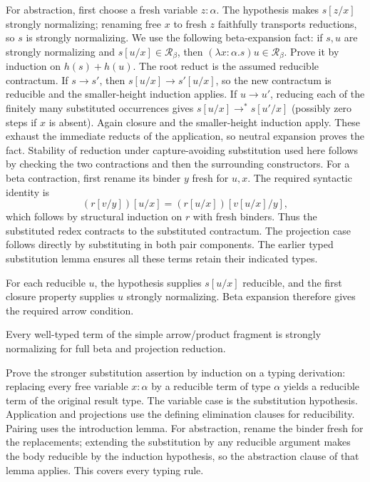 For abstraction, first choose a fresh variable $z:\alpha$. The
hypothesis makes $s[z/x]$ strongly normalizing; renaming free $x$ to
fresh $z$ faithfully transports reductions, so $s$ is strongly
normalizing. We use the following beta-expansion fact: if $s,u$ are
strongly normalizing and $s[u/x]\in\mathcal R_\beta$, then
$(\lambda x:\alpha.s)u\in\mathcal R_\beta$.
Prove it by induction on $h(s)+h(u)$. The root reduct is the assumed
reducible contractum. If $s\to s'$, then $s[u/x]\to s'[u/x]$,
so the new contractum is reducible and the smaller-height induction
applies. If $u\to u'$, reducing each of the finitely many substituted
occurrences gives
$s[u/x]\to^*s[u'/x]$ (possibly zero steps if $x$ is absent).
Again closure and the smaller-height induction apply. These exhaust
the immediate reducts of the application, so neutral expansion proves
the fact. Stability of reduction under capture-avoiding substitution
used here follows by checking the two contractions and then the
surrounding constructors. For a beta contraction, first rename its
binder $y$ fresh for $u,x$. The required syntactic identity is
\[
(r[v/y])[u/x]=(r[u/x])[v[u/x]/y],
\]
which follows by structural induction on $r$ with fresh binders. Thus
the substituted redex contracts to the substituted contractum. The
projection case follows directly by substituting in both pair components.
The earlier typed substitution lemma ensures all these terms retain their
indicated types.

For each reducible $u$, the hypothesis supplies $s[u/x]$ reducible,
and the first closure property supplies $u$ strongly normalizing.
Beta expansion therefore gives the required arrow condition.
\Done

\begin{theorem}
Every well-typed term of the simple arrow/product fragment is strongly
normalizing for full beta and projection reduction.
\end{theorem}
\Proof
Prove the stronger substitution assertion by induction on a typing
derivation: replacing every free variable $x:\alpha$ by a reducible
term of type $\alpha$ yields a reducible term of the original result
type. The variable case is the substitution hypothesis. Application and
projections use the defining elimination clauses for reducibility.
Pairing uses the introduction lemma. For abstraction, rename the binder
fresh for the replacements; extending the substitution by any reducible
argument makes the body reducible by the induction hypothesis, so the
abstraction clause of that lemma applies. This covers every typing rule.

